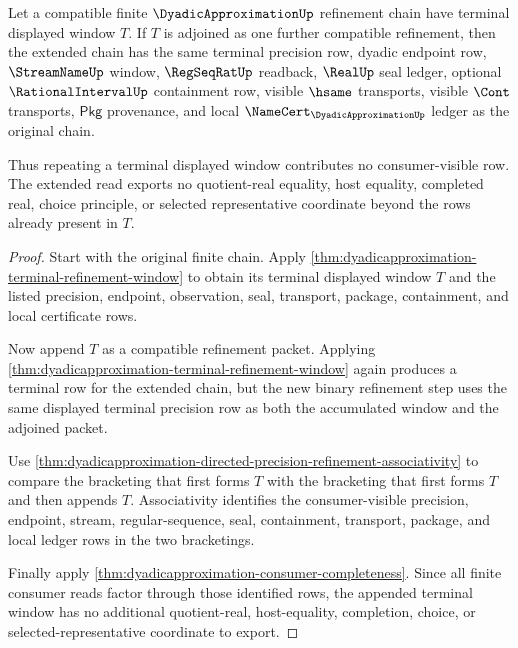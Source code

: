 \begin{theorem}
\label{thm:dyadicapproximation-terminal-window-idempotence}
Let a compatible finite $\DyadicApproximationUp$ refinement chain have terminal
displayed window $T$. If $T$ is adjoined as one further compatible refinement,
then the extended chain has the same terminal precision row, dyadic endpoint
row, $\StreamNameUp$ window, $\RegSeqRatUp$ readback, $\RealUp$ seal ledger,
optional $\RationalIntervalUp$ containment row, visible $\hsame$ transports,
visible $\Cont$ transports, $\mathsf{Pkg}$ provenance, and local
$\NameCert_{\DyadicApproximationUp}$ ledger as the original chain.

Thus repeating a terminal displayed window contributes no consumer-visible row.
The extended read exports no quotient-real equality, host equality, completed
real, choice principle, or selected representative coordinate beyond the rows
already present in $T$.
\end{theorem}
\begin{proof}
Start with the original finite chain. Apply
\autoref{thm:dyadicapproximation-terminal-refinement-window} to obtain its
terminal displayed window $T$ and the listed precision, endpoint, observation,
seal, transport, package, containment, and local certificate rows.

Now append $T$ as a compatible refinement packet. Applying
\autoref{thm:dyadicapproximation-terminal-refinement-window} again produces a
terminal row for the extended chain, but the new binary refinement step uses the
same displayed terminal precision row as both the accumulated window and the
adjoined packet.

Use
\autoref{thm:dyadicapproximation-directed-precision-refinement-associativity}
to compare the bracketing that first forms $T$ with the bracketing that first
forms $T$ and then appends $T$. Associativity identifies the consumer-visible
precision, endpoint, stream, regular-sequence, seal, containment, transport,
package, and local ledger rows in the two bracketings.

Finally apply \autoref{thm:dyadicapproximation-consumer-completeness}. Since
all finite consumer reads factor through those identified rows, the appended
terminal window has no additional quotient-real, host-equality, completion,
choice, or selected-representative coordinate to export.
\end{proof}

